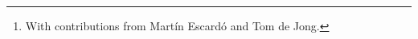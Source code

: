 \documentclass[oneside,a4paper]{book}
\title{#1}
\begin{document}
\author{Jonathan Sterling\thanks{With contributions from Mart\'in Escard\'o and Tom de Jong.}}



\backmatter

\printbibliography
\end{document}
